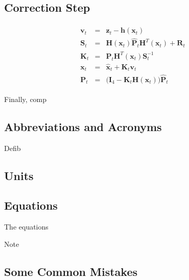\documentclass[letterpaper, 10 pt, conference]{ieeeconf}  %
\begin{document}
\subsection{Correction Step}
\begin{equation}
\begin{split}\begin{array}{rcl}
        \mathbf{v}_t &=& \mathbf{z}_t - \mathbf{h}(\mathbf{x}_t) \\
        \mathbf{S}_t &=& \mathbf{H}(\mathbf{x}_t) \hat{\mathbf{P}}_t \mathbf{H}^T(\mathbf{x}_t) + \mathbf{R}_t \\
        \mathbf{K}_t &=& \hat{\mathbf{P}}_t \mathbf{H}^T(\mathbf{x}_t) \mathbf{S}_t^{-1} \\
        \mathbf{x}_t &=& \hat{\mathbf{x}}_t + \mathbf{K}_t \mathbf{v}_t \\
        \mathbf{P}_t &=& \big(\mathbf{I}_4 - \mathbf{K}_t\mathbf{H}(\mathbf{x}_t)\big)\hat{\mathbf{P}}_t
\end{array}\end{split}
\end{equation}









Finally, comp

\subsection{Abbreviations and Acronyms}
Defib

\subsection{Units}



\subsection{Equations}

The equations



Note

\subsection{Some Common Mistakes}
\end{document}
